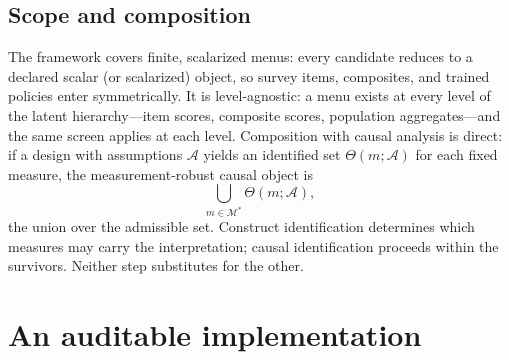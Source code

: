 \documentclass[10pt,letterpaper]{article}
\newcommand{\M}{\ensuremath{\mathcal{M}}}
\begin{document}
\subsection{Scope and composition}
\label{sec:scope}

The framework covers finite, scalarized menus: every candidate reduces to a declared scalar (or scalarized) object, so survey items, composites, and trained policies enter symmetrically.
It is level-agnostic: a menu exists at every level of the latent hierarchy---item scores, composite scores, population aggregates---and the same screen applies at each level.
Composition with causal analysis is direct: if a design with assumptions $\mathcal{A}$ yields an identified set $\Theta(m;\mathcal{A})$ for each fixed measure, the measurement-robust causal object is
\begin{equation}
\bigcup_{m\in\M^*}\Theta(m;\mathcal{A}),
\label{eq:compose}
\end{equation}
the union over the admissible set.
Construct identification determines which measures may carry the interpretation; causal identification proceeds within the survivors.
Neither step substitutes for the other.

\section{An auditable implementation}
\label{sec:impl}
\end{document}
